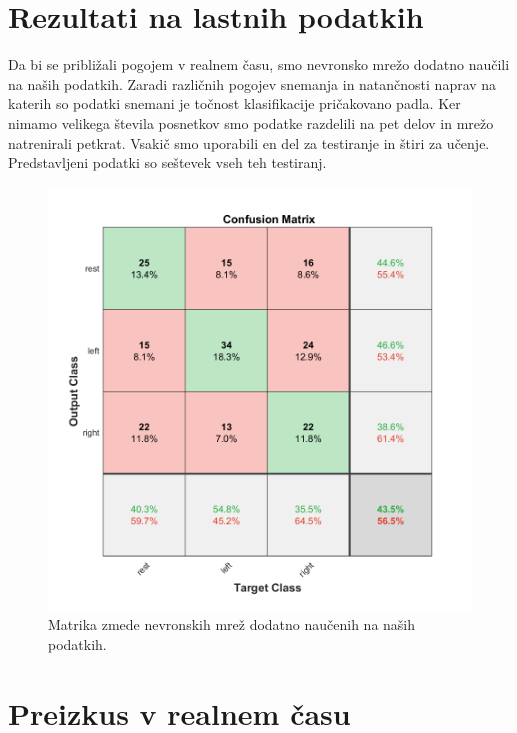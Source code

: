 \section{Rezultati na lastnih podatkih}
Da bi se približali pogojem v realnem času, smo nevronsko mrežo dodatno naučili na naših podatkih. Zaradi različnih pogojev snemanja in natančnosti naprav na katerih so podatki snemani je točnost klasifikacije pričakovano padla. Ker nimamo velikega števila posnetkov smo podatke razdelili na pet delov in mrežo natrenirali petkrat. Vsakič smo uporabili en del za testiranje in štiri za učenje. Predstavljeni podatki so seštevek vseh teh testiranj.
\begin{figure}
\begin{center}
\includegraphics[width=0.8\linewidth]{slike/Confusion_13-20Hz_0s-4s_retrained.png}
\end{center}
\caption{Matrika zmede nevronskih mrež dodatno naučenih na naših podatkih.}
\end{figure}


\section{Preizkus v realnem času}





